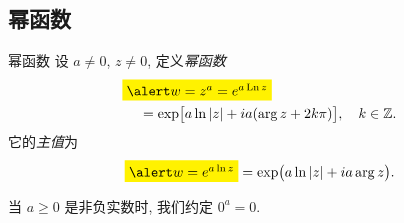 %
%


\subsection{幂函数}
\begin{frame}{幂函数}
\onslide<+->
设 $a\neq 0$, $z\neq 0$, 定义\emph{幂函数}
\begin{align*}
&\abox{$w=z^a=e^{a\Ln z}$}\\
&\hspace{12pt}=\exp\bigl[a\ln\abs{z}+ia(\arg z+2k\pi)\bigr],\quad k\in\BZ.
\end{align*}
\onslide<+->
它的\emph{主值}为
\[\abox{$w=e^{a\ln z}$}=\exp\bigl(a\ln\abs{z}+ia\arg z\bigr).\]

\onslide<+->
当 $a\ge 0$ 是非负实数时, 我们约定 $0^a=0$.
\end{frame}


